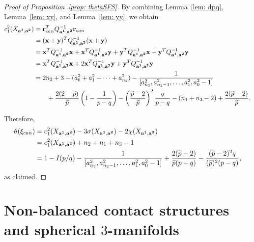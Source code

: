 \documentclass[11pt]{amsart}
\theoremstyle{plain}
\theoremstyle{definition}
\theoremstyle{remark}
\numberwithin{theorem}{section}
\begin{document}
\begin{proof}[Proof of Proposition~\ref{prop: thetaSFS}] By combining Lemma~\ref{lem: dpq},  Lemma~\ref{lem: xy}, and  Lemma~\ref{lem: yy}, we obtain
\begin{equation} \label{eq: c1}
\begin{split}
c_1^2 (X_{{\bf a^1}, {\bf a^2}}) & ={\bf r}^T_{can} Q^{-1}_{{\bf a^1}, {\bf a^2}} {\bf r}_{can}\\
 & =({\bf x}+{\bf y})^T Q^{-1}_{{\bf a^1}, {\bf a^2}} ({\bf x}+{\bf y}) \\
 & =  {\bf x}^T Q^{-1}_{{\bf a^1}, {\bf a^2}} {\bf x} + {\bf x}^T Q^{-1}_{{\bf a^1}, {\bf a^2}} {\bf y} + {\bf y}^T Q^{-1}_{{\bf a^1}, {\bf a^2}} {\bf x} + 
{\bf y}^T Q^{-1}_{{\bf a^1}, {\bf a^2}} {\bf y} \\ & = {\bf x}^T Q^{-1}_{{\bf a^1}, {\bf a^2}} {\bf x} +2 {\bf x}^T Q^{-1}_{{\bf a^1}, {\bf a^2}} {\bf y} + 
{\bf y}^T Q^{-1}_{{\bf a^1}, {\bf a^2}} {\bf y}  \\
 & =  2n_2+3-(a^2_0 +a^2_1+\cdots+a^2_{n_2}) - \dfrac{1}{[a^2_{n_2}, a^2_{n_2-1}, \ldots, a^2_1, a^2_0-1]} \\ 
 & \quad \quad +  \dfrac{2(2-\widetilde{p})}{\widetilde{p}} \left(1-\dfrac{1}{p-q}\right) - \left(\dfrac{\widetilde{p} -2}{\widetilde{p}} \right)^2 \dfrac{q}{p-q} -  (n_1+n_3-2) + \dfrac{2(\widetilde{p} -2)}{\widetilde{p}}.  \end{split}
\end{equation}

Therefore, 
\begin{equation} \label{eq: theta}
\begin{split}
\theta (\xi_{can}) & = c_1^2 (X_{{\bf a^1}, {\bf a^2}}) - 3 \sigma (X_{{\bf a^1}, {\bf a^2}})- 2 \chi (X_{{\bf a^1}, {\bf a^2}}) \\
& =  c_1^2 (X_{{\bf a^1}, {\bf a^2}}) + n_2+n_1+n_3-1 \\
 & =  1- I(p/q)-\dfrac{1}{[a^2_{n_2}, a^2_{n_2-1}, \ldots, a^2_1, a^2_0-1]} +\dfrac{2(\widetilde{p}-2)}{\widetilde{p}(p-q)} -\dfrac{(\widetilde{p}-2)^2 q}{(\widetilde{p})^2(p-q)},
 \end{split}
\end{equation}
as claimed. 
\end{proof}


\section{Non-balanced contact structures and spherical $3$-manifolds} 
\end{document}
